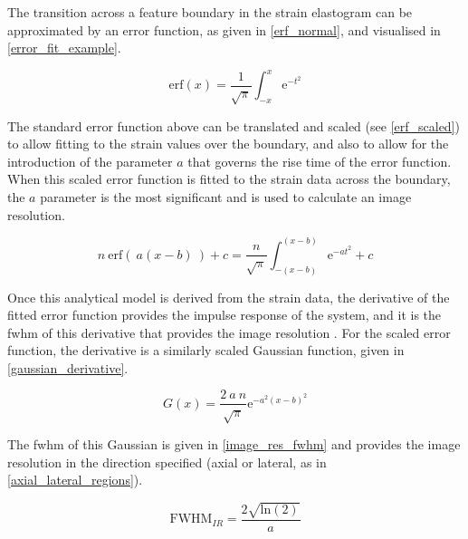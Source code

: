 The transition across a feature boundary in the strain elastogram can be approximated by an error function, as given in \autoref{erf_normal}, and visualised in \autoref{error_fit_example}. 

\begin{equation}
	\text{erf}(x)=\frac{1}{\sqrt{\pi}} \int_{-x}^{x} \text{e}^{-t^2}
	\label{erf_normal}
\end{equation}

The standard error function above can be translated and scaled (see \autoref{erf_scaled}) to allow fitting to the strain values over the boundary, and also to allow for the introduction of the parameter $a$ that governs the rise time of the error function. When this scaled error function is fitted to the strain data across the boundary, the $a$ parameter is the most significant and is used to calculate an image resolution.

\begin{equation}
	n \: \text{erf}(\:a(x-b)\:) + c = \frac{n}{\sqrt{\pi}} \int_{-(x-b)}^{(x-b)} \text{e}^{-a t^2} + c
	\label{erf_scaled}
\end{equation}

Once this analytical model is derived from the strain data, the derivative of the fitted error function provides the impulse response of the system, and it is the \ac{fwhm} of this derivative that provides the image resolution \cite{hepburn_improving_2017}. For the scaled error function, the derivative is a similarly scaled Gaussian function, given in \autoref{gaussian_derivative}.

\begin{equation}
	G(x) = \frac{2\:a\:n}{\sqrt{\pi}} \text{e}^{-a^2 (x-b)^2}
	\label{gaussian_derivative}
\end{equation}

The \ac{fwhm} of this Gaussian is given in \autoref{image_res_fwhm} and provides the image resolution in the direction specified (axial or lateral, as in \autoref{axial_lateral_regions}).

\begin{equation}
	\text{FWHM}_{IR} = \frac{2 \sqrt{\text{ln}(2)}}{a}
	\label{image_res_fwhm}
\end{equation}

